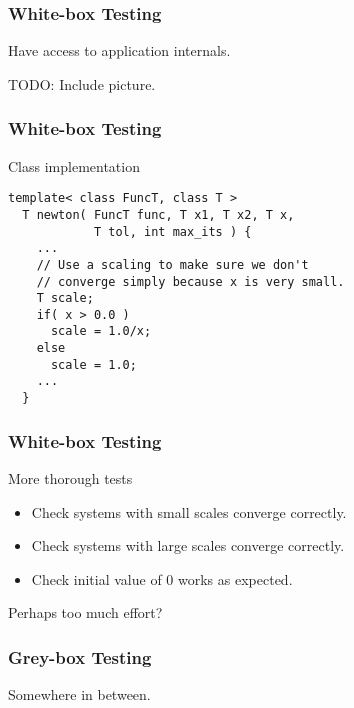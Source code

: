 \begin{frame}
  \frametitle{White-box Testing}
  Have access to application internals.

  TODO: Include picture.
\end{frame}

\begin{frame}[fragile]
  \frametitle{White-box Testing}
  \begin{block}{Class implementation}
    \begin{lstlisting}[style=C]
  template< class FuncT, class T >
  T newton( FuncT func, T x1, T x2, T x,
            T tol, int max_its ) {
    ...
    // Use a scaling to make sure we don't
    // converge simply because x is very small.
    T scale;
    if( x > 0.0 )
      scale = 1.0/x;
    else
      scale = 1.0;
    ...
  }
    \end{lstlisting}
  \end{block}
\end{frame}

\begin{frame}[fragile]
  \frametitle{White-box Testing}
  \begin{block}{More thorough tests}
    \begin{itemize}
    \item Check systems with small scales converge correctly.
    \item Check systems with large scales converge correctly.
    \item Check initial value of 0 works as expected.
    \end{itemize}
  \end{block}
  \pause
  \vspace{1cm}
  {\LARGE\color{Base0A} Perhaps too much effort?}
\end{frame}

\begin{frame}[fragile]
  \frametitle{Grey-box Testing}
  Somewhere in between.
\end{frame}
